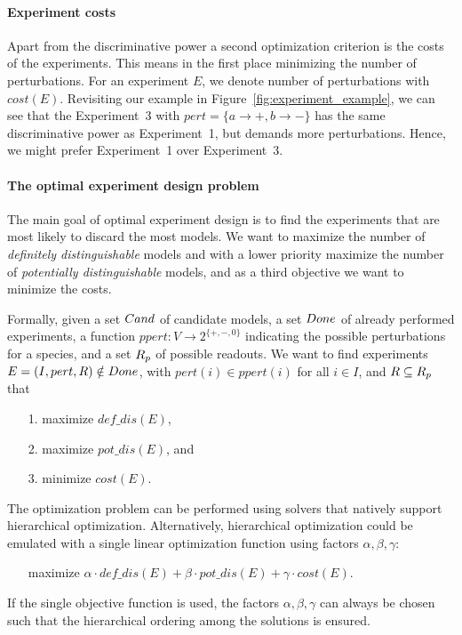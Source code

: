 \paragraph*{\bf Experiment costs}

Apart from the discriminative power a second optimization criterion is the
costs of the experiments.
This means in the first place minimizing the number of perturbations.
For an experiment $E$, we denote number of perturbations with $cost(E)$.
Revisiting our example in Figure~\ref{fig:experiment_example}, we can see that
the Experiment~3 with $pert=\{a \rightarrow \plus, b \rightarrow \minus \}$ has
the same discriminative power as Experiment~1, but demands more perturbations.
Hence, we might prefer Experiment~1 over Experiment~3.


\paragraph*{\bf The optimal experiment design problem}

The main goal of optimal experiment design is to find the experiments that are
most likely to discard the most models.
We want to maximize the number of \emph{definitely distinguishable} models and
with a lower priority maximize the number of \emph{potentially distinguishable}
models, and as a third objective we want to minimize the costs.

Formally, given
 a set $Cand$ of candidate models,
 a set $Done$ of already performed experiments,
 a function $ppert: V \rightarrow 2^{\{\plus,\minus,0\}}$ indicating the possible perturbations for a species, and
 a set $R_p$ of possible readouts.
We want to find experiments $E=(I,pert,R) \notin Done$, with
 $pert(i) \in ppert(i)$ for all $i \in I$, and
 $R \subseteq R_p$
 that
 \begin{itemize}
  \item[1.] maximize $def\_dis(E)$,
  \item[2.] maximize $pot\_dis(E)$, and
  \item[3.] minimize $cost(E)$.
 \end{itemize}
%
The optimization problem can be performed using solvers that natively support
hierarchical optimization.
Alternatively, hierarchical optimization could be emulated  with a single linear
optimization function using factors $\alpha, \beta, \gamma$:
\begin{itemize}
  \item[] maximize $\alpha \cdot def\_dis(E)+ \beta \cdot pot\_dis(E) + \gamma \cdot cost(E)$.
\end{itemize}
If the single objective function is used, the factors $\alpha, \beta, \gamma$ can always be chosen such
that the hierarchical ordering among the solutions is ensured.

